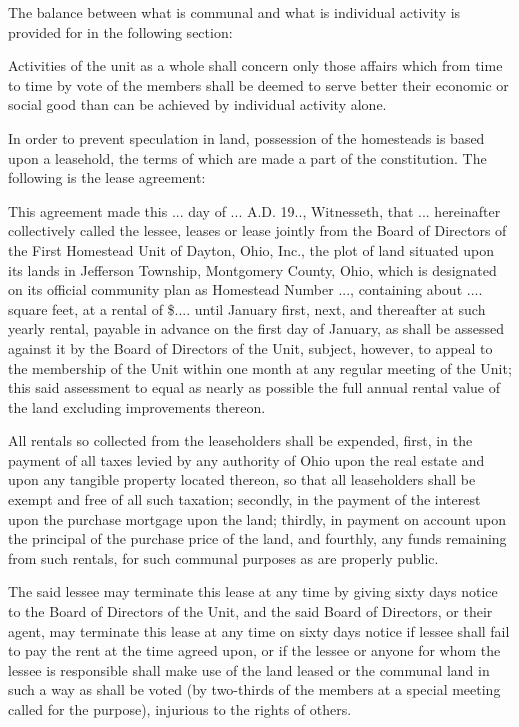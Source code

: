\documentclass{book}
\begin{document}
The balance between what is communal and what is individual activity is provided for in the following section:

Activities of the unit as a whole shall concern only those affairs which from time to time by vote of the members shall be deemed to serve better their economic or social good than can be achieved by individual activity alone.

In order to prevent speculation in land, possession of the homesteads is based upon a leasehold, the terms of which are made a part of the constitution. The following is the lease agreement:

This agreement made this ... day of ... A.D. 19.., Witnesseth, that ... hereinafter collectively called the lessee, leases or lease jointly from the Board of Directors of the First Homestead Unit of Dayton, Ohio, Inc., the plot of land situated upon its lands in Jefferson Township, Montgomery County, Ohio, which is designated on its official community plan as Homestead Number ..., containing about .... square feet, at a rental of \$.... until January first, next, and thereafter at such yearly rental, payable in advance on the first day of January, as shall be assessed against it by the Board of Directors of the Unit, subject, however, to appeal to the membership of the Unit within one month at any regular meeting of the Unit; this said assessment to equal as nearly as possible the full annual rental value of the land excluding improvements thereon.

All rentals so collected from the leaseholders shall be expended, first, in the payment of all taxes levied by any authority of Ohio upon the real estate and upon any tangible property located thereon, so that all leaseholders shall be exempt and free of all such taxation; secondly, in the payment of the interest upon the purchase mortgage upon the land; thirdly, in payment on account upon the principal of the purchase price of the land, and fourthly, any funds remaining from such rentals, for such communal purposes as are properly public.

The said lessee may terminate this lease at any time by giving sixty days notice to the Board of Directors of the Unit, and the said Board of Directors, or their agent, may terminate this lease at any time on sixty days notice if lessee shall fail to pay the rent at the time agreed upon, or if the lessee or anyone for whom the lessee is responsible shall make use of the land leased or the communal land in such a way as shall be voted (by two-thirds of the members at a special meeting called for the purpose), injurious to the rights of others.
\end{document}
